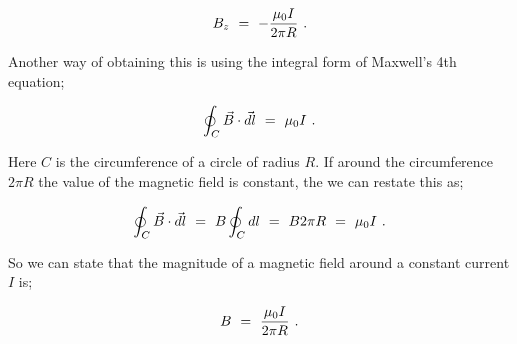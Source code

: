 \documentclass{article}
\begin{document}
\begin{equation} \label{eq:51}
B_z \hspace{0.125cm} = \hspace{0.125cm} - \frac{\mu_{0} I}{2 \pi R} \hspace{0.125cm} .
\end{equation}

Another way of obtaining this is using the integral form of Maxwell's 4th equation;

\begin{equation} \label{eq:51}
\oint_{C} \vec{B} \cdot \vec{dl} \hspace{0.125cm} = \hspace{0.125cm} \mu_{0} I \hspace{0.125cm} .
\end{equation}

Here \begin{math} C \end{math} is the circumference of a circle of radius \begin{math} R \end{math}. If around the circumference \begin{math} 2\pi R \end{math} the value of the magnetic field is constant, the we can restate this as;

\begin{equation} \label{eq:51}
\oint_{C} \vec{B} \cdot \vec{dl} \hspace{0.125cm} = \hspace{0.125cm} B \oint_{C} {dl} \hspace{0.125cm} = \hspace{0.125cm} B 2\pi R \hspace{0.125cm} = \hspace{0.125cm} \mu_{0} I \hspace{0.125cm} .
\end{equation}

So we can state that the magnitude of a magnetic field around a constant current \begin{math} I \end{math} is;

\begin{equation} \label{eq:51}
B \hspace{0.125cm} = \hspace{0.125cm} \frac{\mu_{0} I}{2 \pi R} \hspace{0.125cm} .
\end{equation}
\end{document}
